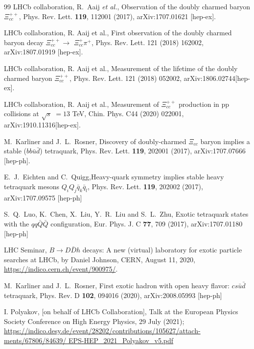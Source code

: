 \documentclass[12pt,prd,onecolumn,floatfix,nofootinbib]{revtex4}
\begin{document}
\begin{thebibliography}{99}
 LHCb collaboration, R.~Aaij \textit{et al.},
Observation of the doubly charmed baryon $\Xi _{cc}^{++}$, Phys. Rev. Lett.
\textbf{119}, 112001 (2017), arXiv:1707.01621 [hep-ex].

 LHCb collaboration, R. Aaij et al., First observation
of the doubly charmed baryon decay $\Xi _{cc}^{++}\rightarrow $ $\Xi
_{cc}^{+}\pi ^{+}$, Phys. Rev. Lett. 121 (2018) 162002, arXiv:1807.01919
[hep-ex].

 LHCb collaboration, R. Aaij et al., Measurement of
the lifetime of the doubly charmed baryon $\Xi _{cc}^{++}$, Phys. Rev. Lett.
121 (2018) 052002, arXiv:1806.02744[hep-ex].

 LHCb collaboration, R. Aaij et al., Measurement of $%
\Xi _{cc}^{++}$ production in pp collisions at $\sqrt{s}$ $=13$ TeV, Chin.
Phys. C44 (2020) 022001, arXiv:1910.11316[hep-ex].

 M.~Karliner and J.~L.~Rosner, Discovery of
doubly-charmed $\Xi _{cc}$ baryon implies a stable ($bb\bar{u}\bar{d}$)
tetraquark, Phys. Rev. Lett. \textbf{119}, 202001 (2017), arXiv:1707.07666
[hep-ph].

 E.~J.~Eichten and C.~Quigg,Heavy-quark symmetry
implies stable heavy tetraquark mesons $Q_{i}Q_{j}\bar{q}_{k}\bar{q}_{l}$,
Phys. Rev. Lett. \textbf{119}, 202002 (2017), arXiv:1707.09575 [hep-ph]

 S.~Q.~Luo, K.~Chen, X.~Liu, Y.~R.~Liu and S.~L.~Zhu,
Exotic tetraquark states with the $qq\bar{Q}\bar{Q}$ configuration, Eur.
Phys. J. C \textbf{77}, 709 (2017), arXiv:1707.01180 [hep-ph]

 LHC Seminar, $B\to D\bar{D}h$ decays: A new (virtual)
laboratory for exotic particle searches at LHCb, by Daniel Johnson, CERN,
August 11, 2020, \href{https://indico.cern.ch/event/900975/}{%
https://indico.cern.ch/event/900975/}.

 M.~Karliner and J.~L.~Rosner, First exotic hadron
with open heavy flavor: $cs\bar{u}\bar{d}$ tetraquark, Phys. Rev. D \textbf{%
102}, 094016 (2020), arXiv:2008.05993 [hep-ph]

 I. Polyakov, [on behalf of LHCb Collaboration], Talk
at the European Physics Society Conference on High Energy Physics, 29 July
(2021); \href{https://indico.desy.de/event/28202/contributions/105627/attach-
ments/67806/84639/ EPS-HEP\_2021\_Polyakov\_v5.pdf}%
{%
https://indico.desy.de/event/28202/contributions/105627/attach-ments/67806/84639/ EPS-HEP\_2021\_Polyakov\_v5.pdf%
}


\end{thebibliography}
\end{document}
